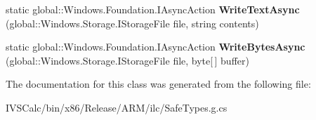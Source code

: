 \begin{DoxyCompactItemize}
\item 
\mbox{\label{class_windows_1_1_storage_1_1_file_i_o_aaa50a5498a60e66bd4e0777c65f59200}} 
static global\+::\+Windows.\+Foundation.\+I\+Async\+Action {\bfseries Write\+Text\+Async} (global\+::\+Windows.\+Storage.\+I\+Storage\+File file, string contents)
\item 
\mbox{\label{class_windows_1_1_storage_1_1_file_i_o_a68b7b3281a0169ff7895ebb2d7ee14b2}} 
static global\+::\+Windows.\+Foundation.\+I\+Async\+Action {\bfseries Write\+Bytes\+Async} (global\+::\+Windows.\+Storage.\+I\+Storage\+File file, byte\mbox{[}$\,$\mbox{]} buffer)
\end{DoxyCompactItemize}


The documentation for this class was generated from the following file\+:\begin{DoxyCompactItemize}
\item 
I\+V\+S\+Calc/bin/x86/\+Release/\+A\+R\+M/ilc/Safe\+Types.\+g.\+cs\end{DoxyCompactItemize}

